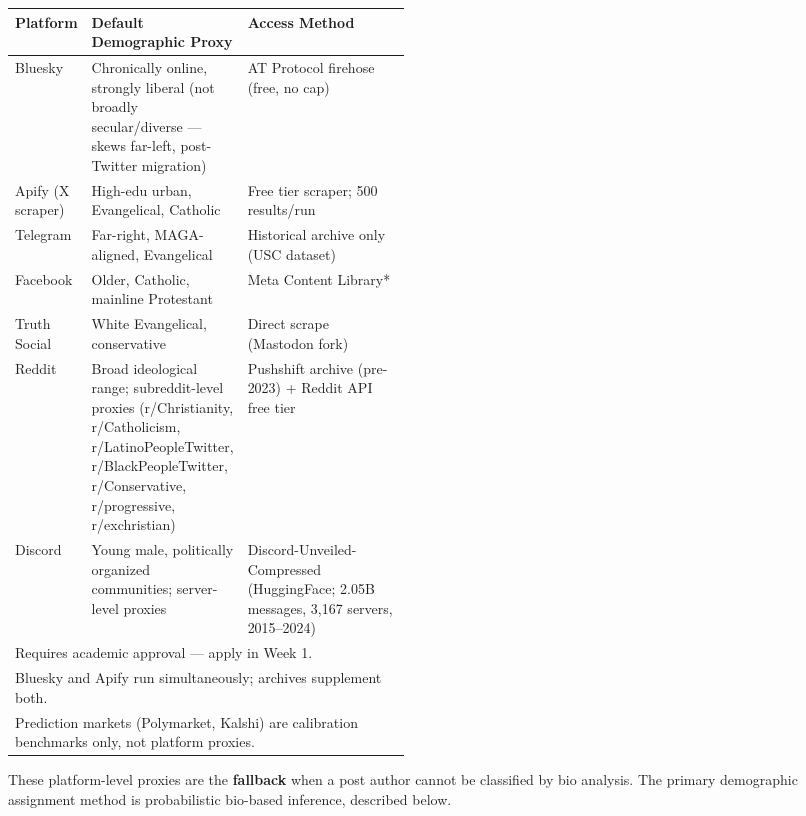 \documentclass[11pt]{article}
\begin{document}
\begin{center}
\begin{tabularx}{\linewidth}{p{0.16\linewidth}p{0.30\linewidth}X}
\toprule
\textbf{Platform} & \textbf{Default Demographic Proxy} & \textbf{Access Method} \\
\midrule
Bluesky & Chronically online, strongly liberal (not broadly secular/diverse --- skews far-left, post-Twitter migration) & AT Protocol firehose (free, no cap) \\
Apify (X scraper) & High-edu urban, Evangelical, Catholic & Free tier scraper; 500 results/run \\
Telegram & Far-right, MAGA-aligned, Evangelical & Historical archive only (USC dataset) \\
Facebook & Older, Catholic, mainline Protestant & Meta Content Library* \\
Truth Social & White Evangelical, conservative & Direct scrape (Mastodon fork) \\
Reddit & Broad ideological range; subreddit-level proxies (r/Christianity, r/Catholicism, r/LatinoPeopleTwitter, r/BlackPeopleTwitter, r/Conservative, r/progressive, r/exchristian) & Pushshift archive (pre-2023) + Reddit API free tier \\
Discord & Young male, politically organized communities; server-level proxies & Discord-Unveiled-Compressed (HuggingFace; 2.05B messages, 3,167 servers, 2015--2024) \\
\bottomrule
\multicolumn{3}{l}{\small *Requires academic approval --- apply in Week 1.} \\
\multicolumn{3}{l}{\small Bluesky and Apify run simultaneously; archives supplement both.} \\
\multicolumn{3}{l}{\small Prediction markets (Polymarket, Kalshi) are calibration benchmarks only, not platform proxies.} \\
\end{tabularx}
\end{center}

\medskip
These platform-level proxies are the \textbf{fallback} when a post author cannot be
classified by bio analysis. The primary demographic assignment method is
probabilistic bio-based inference, described below.
\end{document}
